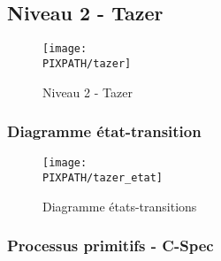 \subsection{Niveau 2 - Tazer}

\begin{center}
\begin{figure}[!h]
\texttt{[image: \\PIXPATH/tazer]}
\caption{Niveau 2 - Tazer}
\end{figure}
\end{center}


\subsubsection{Diagramme état-transition}

\begin{center}
\begin{figure}[!h]
\texttt{[image: \\PIXPATH/tazer\_etat]}
\caption{Diagramme états-transitions}
\end{figure}
\end{center}

\vfill
\pagebreak

\subsubsection{Processus primitifs - C-Spec}

